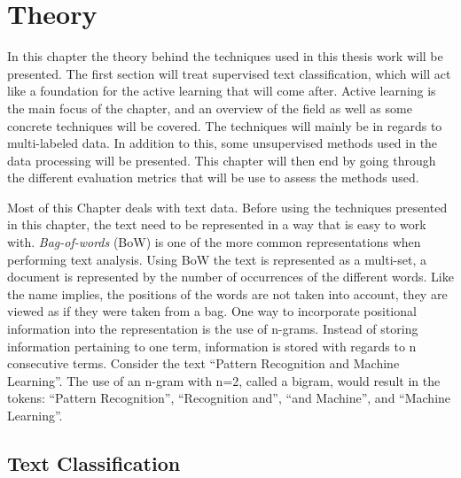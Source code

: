 \chapter{Theory}
\label{cha:theory}

In this chapter the theory behind the techniques used in this thesis work will be presented.
The first section will treat supervised text classification, which will act like a foundation for the active learning that will come after.
Active learning is the main focus of the chapter, and an overview of the field as well as some concrete techniques will be covered.
The techniques will mainly be in regards to multi-labeled data.
In addition to this, some unsupervised methods used in the data processing will be presented.
This chapter will then end by going through the different evaluation metrics that will be use to assess the methods used.

Most of this Chapter deals with text data.
Before using the techniques presented in this chapter, the text need to be represented in a way that is easy to work with.
\textit{Bag-of-words} (BoW) is one of the more common representations when performing text analysis. 
Using BoW the text is represented as a multi-set, a document is represented by the number of occurrences of the different words. 
Like the name implies, the positions of the words are not taken into account, they are viewed as if they were taken from a bag. 
One way to incorporate positional information into the representation is the use of n-grams.
Instead of storing information pertaining to one term, information is stored with regards to n consecutive terms.
Consider the text ``Pattern Recognition and Machine Learning''.
The use of an n-gram with n=2, called a bigram, would result in the tokens: ``Pattern Recognition'', ``Recognition and'', ``and Machine'', and ``Machine Learning''.

\section{Text Classification}\label{sec:text-classification}

